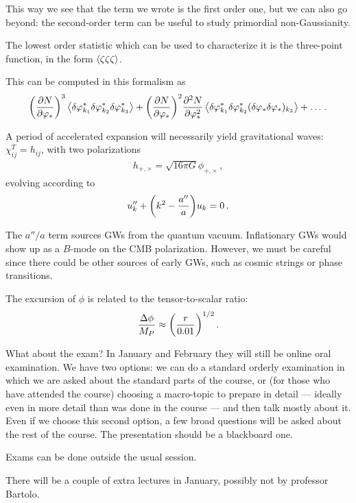 \documentclass[main.tex]{subfiles}
\begin{document}
This way we see that the term we wrote is the first order one, but we can also go beyond: the second-order term can be useful to study primordial non-Gaussianity. 

The lowest order statistic which can be used to characterize it is the three-point function, in the form \(\expval{\zeta \zeta \zeta }\). 

This can be computed in this formalism as 
%
\begin{align}
\qty(\pdv{N}{\varphi _*})^3 \expval{ \delta \varphi _{k_1 }^{*}\delta \varphi _{k_2 }^{*}\delta \varphi _{k_3 }^{*}} 
+ 
\qty(\pdv{N}{\varphi _*})^2 \pdv[2]{N}{\varphi _*}
\expval{
    \delta \varphi ^*_{k_1 }
    \delta \varphi ^*_{k_2 }
    (\delta \varphi _* \delta \varphi _*)_{k_3 }
} + \dots
\,.
\end{align}

A period of accelerated expansion will necessarily yield gravitational waves: \(\chi_{ij}^{T} = h_{ij}\), with two polarizations 
%
\begin{align}
h_{+, \times} = \sqrt{16 \pi G } \phi_{+, \times }
\,,
\end{align}
%
evolving according to 
%
\begin{align}
u_k'' + \qty(k^2 - \frac{a''}{a}) u_k = 0
\,.
\end{align}

The \(a'' / a\) term sources GWs from the quantum vacuum. 
Inflationary GWs would show up as a \(B\)-mode on the CMB polarization. 
However, we must be careful since there could be other sources of early GWs, such as cosmic strings or phase transitions. 

The excursion of \(\phi \) is related to the tensor-to-scalar ratio: 
%
\begin{align}
\frac{\Delta \phi }{M_P} \approx \qty( \frac{r}{\num{.01}})^{1/2}
\,.
\end{align}

What about the exam? In January and February they will still be online oral examination.
We have two options: we can do a standard orderly examination in which we are asked about the standard parts of the course, or (for those who have attended the course) choosing a macro-topic to prepare in detail --- ideally even in more detail than was done in the course --- and then talk mostly about it. Even if we choose this second option, a few broad questions will be asked about the rest of the course. 
The presentation should be a blackboard one.

Exams can be done outside the usual session. 

There will be a couple of extra lectures in January, possibly not by professor Bartolo. 
\end{document}
